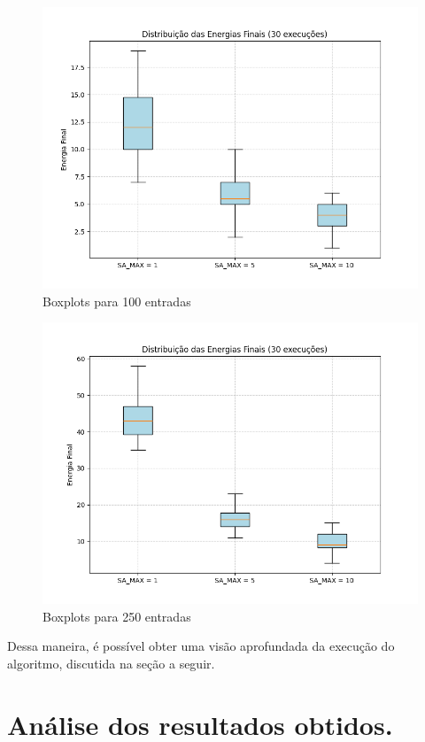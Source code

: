 \documentclass[12pt]{article}
\begin{document}
\begin{figure}[H]
  \centering
  \includegraphics[width=.9\textwidth]{../../boxplot_100.png}
  \caption{Boxplots para 100 entradas}
  \label{fig:metodologia}
   \end{figure}

\begin{figure}[H]
  \centering
  \includegraphics[width=.9\textwidth]{../../boxplot_250.png}
  \caption{Boxplots para 250 entradas}
  \label{fig:metodologia}
  \end{figure}

Dessa maneira, é possível obter uma visão aprofundada da execução do algoritmo, discutida na seção a seguir.

\section{Análise dos resultados obtidos.}
\label{sec:analise_dos_resultados_obtidos}
\end{document}
